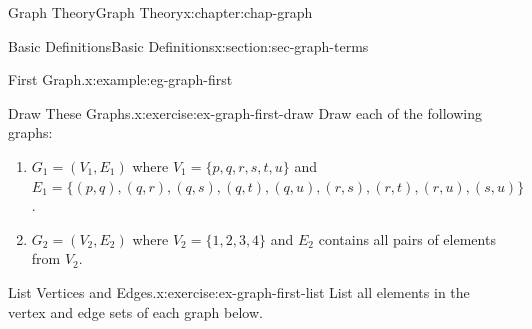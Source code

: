 \documentclass[oneside,10pt,]{book}
\numberwithin{equation}{section}
\begin{document}
\begin{chapterptx}{Graph Theory}{}{Graph Theory}{}{}{x:chapter:chap-graph}
\begin{sectionptx}{Basic Definitions}{}{Basic Definitions}{}{}{x:section:sec-graph-terms}
\begin{example}{First Graph.}{x:example:eg-graph-first}
\begin{sidebyside}{1}{0.375}{0.375}{0}
\begin{sbspanel}{0.25}
{
}%
\end{sbspanel}%
\end{sidebyside}%
\end{example}
\begin{inlineexercise}{Draw These Graphs.}{x:exercise:ex-graph-first-draw}%
Draw each of the following graphs:%
\begin{enumerate}[label=(\alph*)]
\item{}\(G_1 = (V_1, E_1)\) where \(V_1 = \{p, q, r, s, t, u\}\) and \(E_1 = \{(p,q),(q,r),(q,s),(q,t),(q,u),(r,s),(r,t),(r,u),(s,u)\}\).%
\item{}\(G_2 = (V_2, E_2)\) where \(V_2 = \{1,2,3,4\}\) and \(E_2\) contains all pairs of elements from \(V_2\).%
\end{enumerate}
%
\end{inlineexercise}
\begin{inlineexercise}{List Vertices and Edges.}{x:exercise:ex-graph-first-list}%
List all elements in the vertex and edge sets of each graph below.%
\begin{sidebyside}{2}{0.2}{0.2}{0.06}%
\begin{sbspanel}{0.22}%
\end{sbspanel}
\end{sidebyside}
\end{inlineexercise}
\end{sectionptx}
\end{chapterptx}
\end{document}
